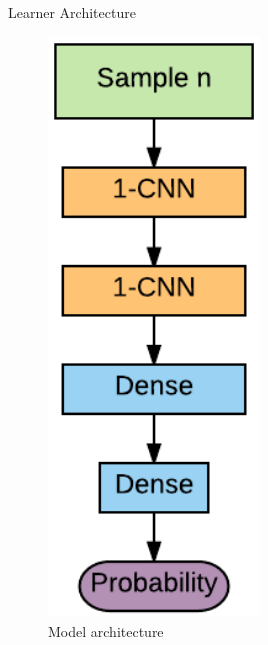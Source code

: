 \documentclass[notes]{beamer}
\begin{document}

\begin{frame}{Learner Architecture}
\begin{minipage}{0.45\textwidth}
	\begin{figure}
		\includegraphics[width=0.5\textwidth]{figures/cnn_sabater}
		\caption{Model architecture}
	\end{figure}
\end{minipage}
\begin{minipage}{0.45\textwidth}
	\begin{figure}

\end{figure}
\end{minipage}
\end{frame}
\end{document}
